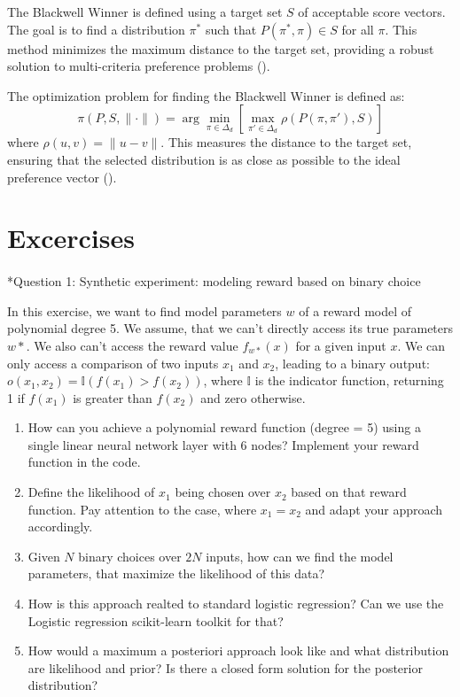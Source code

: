 \documentclass[
  letterpaper,
  DIV=11,
  numbers=noendperiod,
  oneside]{scrreprt}
\makeatletter
\let\oldparagraph\paragraph
\renewcommand{\paragraph}{
    \@ifstar
      \xxxParagraphStar
      \xxxParagraphNoStar
  }
\newcommand{\xxxParagraphStar}[1]{\oldparagraph*{#1}\mbox{}}
\newcommand{\xxxParagraphNoStar}[1]{\oldparagraph{#1}\mbox{}}
\theoremstyle{remark}
\makeatother
\begin{document}
The Blackwell Winner is defined using a target set \(S\) of acceptable
score vectors. The goal is to find a distribution \(\pi^*\) such that
\(P(\pi^*, \pi) \in S\) for all \(\pi\). This method minimizes the
maximum distance to the target set, providing a robust solution to
multi-criteria preference problems
().

The optimization problem for finding the Blackwell Winner is defined as:
\[\pi(P, S, \|\cdot\|) = \arg \min_{\pi \in \Delta_d} \left[ \max_{\pi' \in \Delta_d} \rho(P(\pi, \pi'), S) \right]\]
where \(\rho(u, v) = \|u - v\|\). This measures the distance to the
target set, ensuring that the selected distribution is as close as
possible to the ideal preference vector
().

\section{Excercises}\label{excercises}

\paragraph*{Question 1: Synthetic experiment: modeling reward based on
binary
choice}\label{question-1-synthetic-experiment-modeling-reward-based-on-binary-choice}

In this exercise, we want to find model parameters \(w\) of a reward
model of polynomial degree 5. We assume, that we can't directly access
its true parameters \(w*\). We also can't access the reward value
\(f_{w*}(x)\) for a given input \(x\). We can only access a comparison
of two inputs \(x_1\) and \(x_2\), leading to a binary output:
\(o(x_1,x_2)=\mathbb{I}(f(x_1)>f(x_2))\), where \(\mathbb{I}\) is the
indicator function, returning 1 if \(f(x_1)\) is greater than \(f(x_2)\)
and zero otherwise.

\begin{enumerate}
\def\labelenumi{\arabic{enumi}.}
\item
  How can you achieve a polynomial reward function (degree = 5) using a
  single linear neural network layer with 6 nodes? Implement your reward
  function in the code.
\item
  Define the likelihood of \(x_1\) being chosen over \(x_2\) based on
  that reward function. Pay attention to the case, where \(x_1 = x_2\)
  and adapt your approach accordingly.
\item
  Given \(N\) binary choices over \(2N\) inputs, how can we find the
  model parameters, that maximize the likelihood of this data?
\item
  How is this approach realted to standard logistic regression? Can we
  use the Logistic regression scikit-learn toolkit for that?
\item
  How would a maximum a posteriori approach look like and what
  distribution are likelihood and prior? Is there a closed form solution
  for the posterior distribution?
\end{enumerate}
\end{document}
